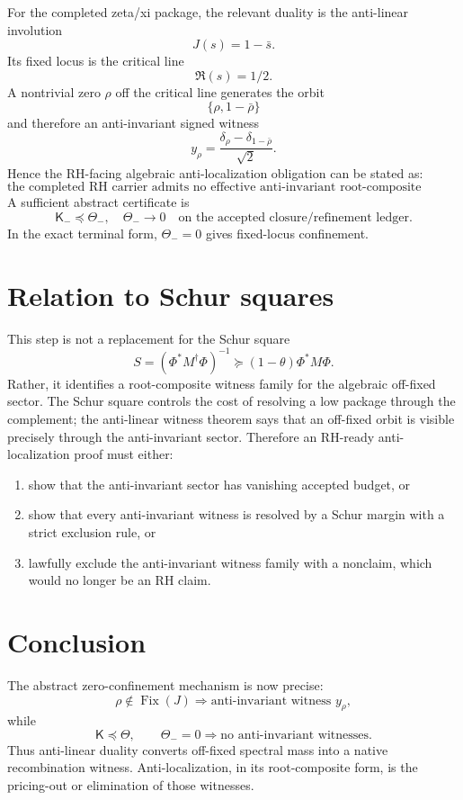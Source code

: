 \documentclass[11pt]{article}
\newcommand{\Kmat}{\mathsf K}
\newcommand{\ThetaB}{\mathsf\Theta}
\newcommand{\Fix}{\operatorname{Fix}}
\begin{document}
For the completed zeta/xi package, the relevant duality is the anti-linear involution
\[
J(s)=1-\bar s.
\]
Its fixed locus is the critical line
\[
\Re(s)=1/2.
\]
A nontrivial zero $\rho$ off the critical line generates the orbit
\[
\{\rho,1-\bar\rho\}
\]
and therefore an anti-invariant signed witness
\[
y_\rho=\frac{\delta_\rho-\delta_{1-\bar\rho}}{\sqrt2}.
\]
Hence the RH-facing algebraic anti-localization obligation can be stated as:
\[
\boxed{
\text{the completed RH carrier admits no effective anti-invariant root-composite witnesses.}
}
\]
A sufficient abstract certificate is
\[
\boxed{
\Kmat_-\preceq \Theta_-,\quad \Theta_-\to0
\quad\text{on the accepted closure/refinement ledger.}
}
\]
In the exact terminal form, $\Theta_-=0$ gives fixed-locus confinement.

\section{Relation to Schur squares}

This step is not a replacement for the Schur square
\[
S=(\Phi^*M^\dagger\Phi)^{-1}\succeq(1-\theta)\Phi^*M\Phi.
\]
Rather, it identifies a root-composite witness family for the algebraic off-fixed sector.  The Schur square controls the cost of resolving a low package through the complement; the anti-linear witness theorem says that an off-fixed orbit is visible precisely through the anti-invariant sector.  Therefore an RH-ready anti-localization proof must either:
\begin{enumerate}[label=(\alph*)]
\item show that the anti-invariant sector has vanishing accepted budget, or
\item show that every anti-invariant witness is resolved by a Schur margin with a strict exclusion rule, or
\item lawfully exclude the anti-invariant witness family with a nonclaim, which would no longer be an RH claim.
\end{enumerate}

\section{Conclusion}

The abstract zero-confinement mechanism is now precise:
\[
\rho\notin\Fix(J)
\Rightarrow
\text{anti-invariant witness }y_\rho,
\]
while
\[
\Kmat\preceq\ThetaB,
\qquad
\Theta_- =0
\Rightarrow
\text{no anti-invariant witnesses.}
\]
Thus anti-linear duality converts off-fixed spectral mass into a native recombination witness.  Anti-localization, in its root-composite form, is the pricing-out or elimination of those witnesses.
\end{document}
